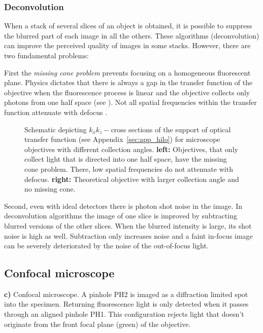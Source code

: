 \subsubsection*{Deconvolution}
When a stack of several slices of an object is obtained, it is
possible to suppress the blurred part of each image in all the
others. These algorithms (deconvolution) can improve the perceived
quality of images in some stacks. However, there are two fundamental
problems:

First the \emph{missing cone problem} prevents focusing on a
homogeneous fluorescent plane. Physics dictates that there is always a
gap in the transfer function of the objective when the fluorescence
process is linear and the objective collects only photons from one
half space (see ). Not all spatial
frequencies within the transfer function attenuate with defocus
\citep{Neil1997}.

\begin{figure}[!hbt]
  \centering
  \caption{Schematic depicting $k_xk_z-$cross sections of the support
    of optical transfer function (see Appendix~\ref{sec:app_hilo}) for
    microscope objectives with different collection angles. {\bf
      left:} Objectives, that only collect light that is directed into
    one half space, have the missing cone problem. There, low spatial
    frequencies do not attenuate with defocus. {\bf right:} Theoretical
    objective with larger collection angle and no missing cone.}
  \label{fig:missing-cone}
\end{figure}

Second, even with ideal detectors there is photon shot noise in the
image. In deconvolution algorithms the image of one slice is improved
by subtracting blurred versions of the other slices. When the blurred
intensity is large, its shot noise is high as well. Subtraction only
increases noise and a faint in-focus image can be severely
deteriorated by the noise of the out-of-focus light.
\subsection{Confocal microscope}


{\bf c)} Confocal
    microscope. A pinhole PH2 is imaged as a diffraction limited spot
    into the specimen. Returning fluorescence light is only detected
    when it passes through an aligned pinhole PH1. This configuration
    rejects light that doesn't originate from the front focal plane
    (green) of the objective.

